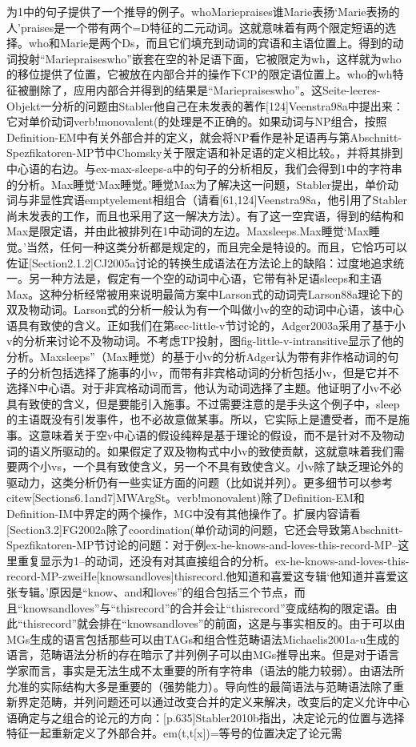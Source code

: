 为1中的句子提供了一个推导的例子。whoMariepraises谁Marie表扬`Marie表扬的人'praises是一个带有两个=D特征的二元动词。这就意味着有两个限定短语的选择。who和Marie是两个Ds，而且它们填充到动词的宾语和主语位置上。得到的动词投射“Mariepraiseswho”嵌套在空的补足语下面，它被限定为wh，这样就为who的移位提供了位置，它被放在内部合并的操作下CP的限定语位置上。who的wh特征被删除了，应用内部合并得到的结果是“Mariepraiseswho”。这Seite-leeres-Objekt一分析的问题由Stabler他自己在未发表的著作[124]Veenstra98a中提出来：它对单价动词verb!monovalent(的处理是不正确的。如果动词与NP组合，按照Definition-EM中有关外部合并的定义，就会将NP看作是补足语再与第Abschnitt-Spezfikatoren-MP节中Chomsky关于限定语和补足语的定义相比较。，并将其排到中心语的右边。与ex-max-sleeps-a中的句子的分析相反，我们会得到1中的字符串的分析。Max睡觉`Max睡觉。'睡觉Max为了解决这一问题，Stabler提出，单价动词与非显性宾语emptyelement相组合（请看[61,124]Veenstra98a，他引用了Stabler尚未发表的工作，而且也采用了这一解决方法）。有了这一空宾语，得到的结构和Max是限定语，并由此被排列在1中动词的左边。Maxsleeps.Max睡觉`Max睡觉。'当然，任何一种这类分析都是规定的，而且完全是特设的。而且，它恰巧可以佐证[Section2.1.2]CJ2005a讨论的转换生成语法在方法论上的缺陷：过度地追求统一。另一种方法是，假定有一个空的动词中心语，它带有补足语sleeps和主语Max。这种分析经常被用来说明最简方案中Larson式的动词壳Larson88a理论下的双及物动词。Larson式的分析一般认为有一个叫做小v的空的动词中心语，该中心语具有致使的含义。正如我们在第sec-little-v节讨论的，Adger2003a采用了基于小v的分析来讨论不及物动词。不考虑TP投射，图fig-little-v-intransitive显示了他的分析。Maxsleeps”（Max睡觉）的基于小v的分析Adger认为带有非作格动词的句子的分析包括选择了施事的小v，而带有非宾格动词的分析包括小v，但是它并不选择N中心语。对于非宾格动词而言，他认为动词选择了主题。他证明了小v不必具有致使的含义，但是要能引入施事。不过需要注意的是手头这个例子中，sleep的主语既没有引发事件，也不必故意做某事。所以，它实际上是遭受者，而不是施事。这意味着关于空v中心语的假设纯粹是基于理论的假设，而不是针对不及物动词的语义所驱动的。如果假定了双及物构式中小v的致使贡献，这就意味着我们需要两个小vs，一个具有致使含义，另一个不具有致使含义。小v除了缺乏理论外的驱动力，这类分析仍有一些实证方面的问题（比如说并列）。更多细节可以参考citew[Sections6.1and7]MWArgSt。verb!monovalent)除了Definition-EM和Definition-IM中界定的两个操作，MG中没有其他操作了。扩展内容请看[Section3.2]FG2002a除了coordination(单价动词的问题，它还会导致第Abschnitt-Spezfikatoren-MP节讨论的问题：对于例ex-he-knows-and-loves-this-record-MP--这里重复显示为1--的动词，还没有对其直接组合的分析。ex-he-knows-and-loves-this-record-MP-zweiHe[knowsandloves]thisrecord.他知道和喜爱这专辑`他知道并喜爱这张专辑。'原因是“know、and和loves”的组合包括三个节点，而且“knowsandloves”与“thisrecord”的合并会让“thisrecord”变成结构的限定语。由此“thisrecord”就会排在“knowsandloves”的前面，这是与事实相反的。由于可以由MGs生成的语言包括那些可以由TAGs和组合性范畴语法Michaelis2001a-u生成的语言，范畴语法分析的存在暗示了并列例子可以由MGs推导出来。但是对于语言学家而言，事实是无法生成不太重要的所有字符串（语法的能力较弱）。由语法所允准的实际结构大多是重要的（强势能力）。导向性的最简语法与范畴语法除了重新界定范畴，并列问题还可以通过改变合并的定义来解决，改变后的定义允许中心语确定与之组合的论元的方向：[p.635]Stabler2010b指出，决定论元的位置与选择特征一起重新定义了外部合并。em(t,t[x])=等号的位置决定了论元需